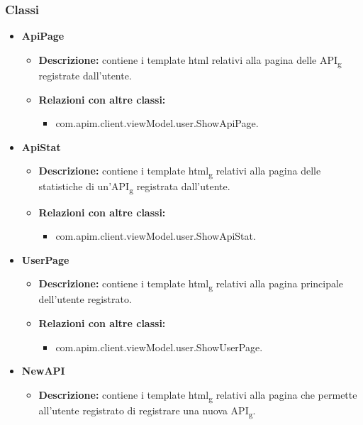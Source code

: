 {{		\subsubsection{Classi}{
			\begin{itemize}
				\item \textbf{ApiPage}
					\begin{itemize}
						\item \textbf{Descrizione:} contiene i template html relativi alla pagina delle API\textsubscript{g} registrate dall'utente.
						\item \textbf{Relazioni con altre classi:}
						\begin{itemize}
							\item com.apim.client.viewModel.user.ShowApiPage.
						\end{itemize}
					\end{itemize}
				\item \textbf{ApiStat}
					\begin{itemize}
						\item \textbf{Descrizione:} contiene i template html\textsubscript{g} relativi alla pagina delle statistiche di un'API\textsubscript{g} registrata dall'utente.
						\item \textbf{Relazioni con altre classi:}
						\begin{itemize}
							\item com.apim.client.viewModel.user.ShowApiStat.
						\end{itemize}
					\end{itemize}
				\item \textbf{UserPage}
					\begin{itemize}
						\item \textbf{Descrizione:} contiene i template html\textsubscript{g} relativi alla pagina principale dell'utente registrato.
						\item \textbf{Relazioni con altre classi:}
						\begin{itemize}
							\item com.apim.client.viewModel.user.ShowUserPage.
						\end{itemize}
					\end{itemize}
				\item \textbf{NewAPI}
					\begin{itemize}
						\item \textbf{Descrizione:} contiene i template html\textsubscript{g} relativi alla pagina che permette all'utente registrato di registrare una nuova API\textsubscript{g}.

\end{itemize}
\end{itemize}}}}
